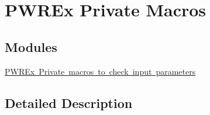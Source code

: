 \hypertarget{group___p_w_r_ex___private___macros}{}\section{P\+W\+R\+Ex Private Macros}
\label{group___p_w_r_ex___private___macros}
\subsection*{Modules}
\begin{DoxyCompactItemize}
\item 
\mbox{\hyperlink{group___p_w_r_ex___i_s___p_w_r___definitions}{P\+W\+R\+Ex Private macros to check input parameters}}
\end{DoxyCompactItemize}


\subsection{Detailed Description}
